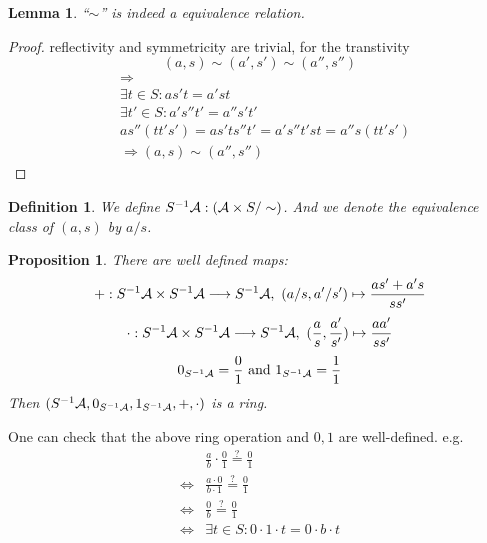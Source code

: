 \documentclass[11pt]{article}
\newtheorem{prop}[thm]{Proposition}
\newtheorem{lemma}[thm]{Lemma}
\newtheorem{dfn}[thm]{Definition}
\newcommand{\cala}{{\cal A}}
\newcommand{\Lrta}{\Longrightarrow}
\newcommand{\lrta}{\longrightarrow}
\newcommand{\Llrta}{\Longleftrightarrow}
\begin{document}
\begin{lemma}
``$\sim$'' is indeed a equivalence relation.
\end{lemma}
\begin{proof}
reflectivity and symmetricity are trivial, for the transtivity
$$
(a,s)\sim(a',s')\sim (a'',s'')
$$
$$
\begin{aligned}
&\Lrta\\
&\exists t\in S: as't=a's t\\
& \exists t'\in S: a's'' t'=a''s't'\\
&as''(tt's')=as'ts''t'=a's''t's t=a''s (t t's')\\
& \Lrta (a,s)\sim(a'',s'')
\end{aligned}
$$
\end{proof}
\begin{dfn}
We define 
$S^{-1}\cala:(\cala\times S/\sim)$.  And we denote the equivalence class of $(a,s)$ by $a/s$.
\end{dfn}
\begin{prop}
There are well defined maps:
$$
+:S^{-1}\cala\times S^{-1}\cala\lrta S^{-1}\cala,\ (a/s,a'/s')\mapsto \frac{as'+a's}{ss'}
$$
$$
\cdot:S^{-1}\cala\times S^{-1}\cala\lrta S^{-1}\cala,\ (\frac{a}{s},\frac{a'}{s'})\mapsto \frac{aa'}{ss'}
$$
$$
0_{S^{-1}\cala}=\frac{0}{1}\text{ and } 1_{S^{-1}\cala}=\frac{1}{1}
$$
Then $(S^{-1}\cala,0_{S^{-1}\cala},1_{S^{-1}\cala},+,\cdot)$ is a ring.
\end{prop}
One can check that the above ring operation and $0,1$ are well-defined. e.g.\\
$$
\begin{aligned}
&\frac{a}{b}\cdot\frac{0}{1}\overset{?}{=}\frac{0}{1}\\
\Llrta & \frac{a\cdot 0}{b\cdot 1}\overset{?}{=}\frac{0}{1}\\
\Llrta & \frac{0}{b}\overset{?}{=}\frac{0}{1}\\
\Llrta &\exists t\in S: 0\cdot 1\cdot t=0\cdot b\cdot t
\end{aligned}
$$
\end{document}
